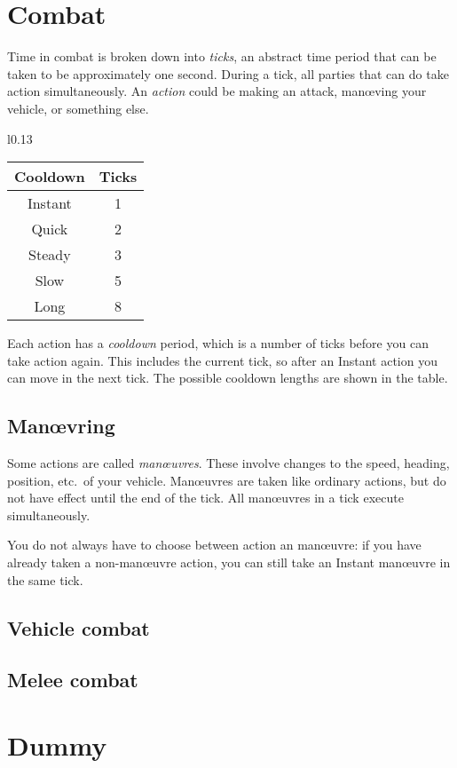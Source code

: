 \documentclass[10pt, a4paper, twocolumn]{article}
\begin{document}
\section{Combat}
Time in combat is broken down into \emph{ticks}, an abstract time period that
can be taken to be approximately one second. During a tick, all parties that
can do take action simultaneously. An \emph{action} could be making an attack,
man\oe{}ving your vehicle, or something else.

\begin{wraptable}[7]{l}{0.13\textwidth}
\vspace*{-3ex}
\begin{tabular}{cc}
  Cooldown & Ticks \\
  \hline 
  Instant  & 1     \\
  Quick    & 2     \\
  Steady   & 3     \\
  Slow     & 5     \\
  Long     & 8
\end{tabular}
\end{wraptable}

Each action has a \emph{cooldown} period, which is a number of ticks before you
can take action again. This includes the current tick, so after an Instant
action you can move in the next tick. The possible cooldown lengths are shown in
the table. 

\subsection{Man\oe{}vring}
Some actions are called \emph{man\oe{}uvres}. These involve changes to the speed,
heading, position, etc.\ of your vehicle. Man\oe{}uvres are taken like ordinary
actions, but do not have effect until the end of the tick. All man\oe{}uvres in a
tick execute simultaneously.

You do not always have to choose between action an man\oe{}uvre: if you have
already taken a non-man\oe{}uvre action, you can still take an Instant
man\oe{}uvre in the same tick. 



\subsection{Vehicle combat}
\subsection{Melee combat}

\section{Dummy}
\lipsum{}
\end{document}
